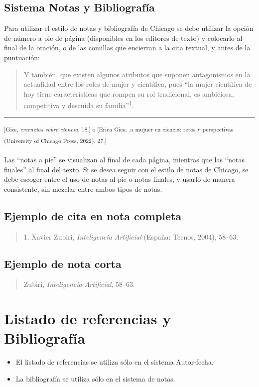 \documentclass[12pt,a4paper]{article}
\begin{document}
\begin{enumerate}[resume]
\subsection{Sistema Notas y Bibliografía}


Para utilizar el estilo de notas y bibliografía de Chicago se debe utilizar la opción de número a pie de página (disponibles en los editores de texto) y colocarlo al final de la oración, o de las comillas que encierran a la cita textual, y antes de la puntuación:

\begin{quote}
Y también, que existen algunos atributos que suponen antagonismos en la actualidad entre los roles de mujer y científica, pues ``la mujer científica de hoy tiene características que rompen su rol tradicional, es ambiciosa, competitiva y descuida su familia''\textsuperscript{1}.
\end{quote}

\rule{\linewidth}{0.4pt}

\noindent \textsuperscript{[Gies, \textit{creencias sobre ciencia}, 18.] o [Erica Gies,  .a mujuer en ciencia: retos y perspectivas (University of Chicago Press, 2022), 27.]
\vspace{1em}}

Las ``notas a pie'' se visualizan al final de cada página, mientras que las ``notas finales'' al final del texto. Si se desea seguir con el estilo de notas de Chicago, se debe escoger entre el uso de notas al pie o notas finales, y usarlo de manera consistente, sin mezclar entre ambos tipos de notas.


\subsection*{Ejemplo de cita en nota completa}
\begin{quote}
1. Xavier Zubiri, \textit{Inteligencia Artificial} (España: Tecnos, 2004), 58--63.
\end{quote}

\subsection*{Ejemplo de nota corta}
\begin{quote}
Zubiri, \textit{Inteligencia Artificial}, 58--63.
\end{quote}

\section{Listado de referencias y Bibliografía}
\begin{itemize}
    \item El listado de referencias se utiliza sólo en el sistema Autor-fecha.
    \item La bibliografía se utiliza sólo en el sistema de notas.
\end{itemize}


\end{enumerate}
\end{document}
